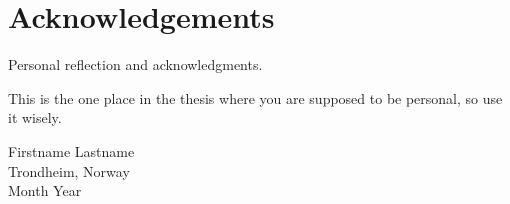 
\section{Acknowledgements}

Personal reflection and acknowledgments.

This is the one place in the thesis where you are supposed to be personal, so use it wisely. 



\begin{flushright}
	Firstname Lastname \\
	Trondheim, Norway\\
	Month Year
\end{flushright}